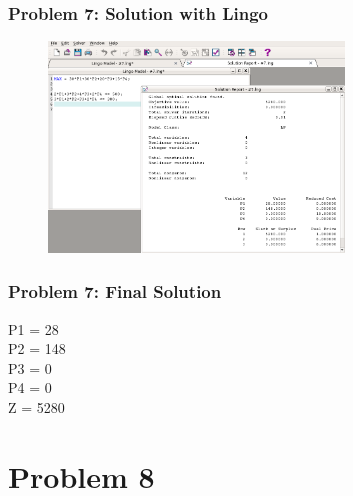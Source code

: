 \documentclass[10pt,svgnames,fragile]{beamer}
\begin{document}
\begin{frame}[label={sec:orge9abdcb}]{}

\frametitle{Problem 7: Solution with Lingo }
\begin{figure}
\includegraphics[width=0.7\textwidth]{images/7.png}
\end{figure}


\end{frame}

\begin{frame}[label={sec:org9c62e72}]{}
\frametitle{Problem 7: Final Solution}

P1 = 28\\
P2 = 148\\
P3 = 0\\
P4 = 0\\
Z = 5280
\end{frame}




\section{Problem 8}
\label{sec:org92dd686}
\end{document}
